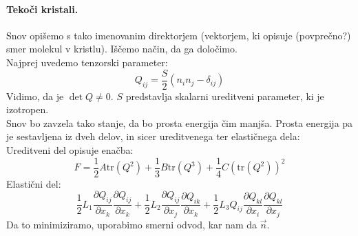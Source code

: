\documentclass[a4paper]{article}
\newcommand{\vct}[1]{\overrightarrow{#1}}
\newcommand{\pd}[2]{\frac{\partial {#1}}{\partial {#2}}}
\begin{document}
\paragraph{Tekoči kristali.} Snov opišemo s tako imenovanim direktorjem (vektorjem, ki opisuje (povprečno?) smer molekul v kristlu). Iščemo način, da ga določimo. \\
Najprej uvedemo tenzorski parameter:
$$Q_{ij} = \frac{S}{2} \left(n_in_j - \delta_{ij}\right)$$
Vidimo, da je $\det Q \neq 0$. $S$ predstavlja skalarni ureditveni parameter, ki je izotropen. \\[3mm]
Snov bo zavzela tako stanje, da bo prosta energija čim manjša. Prosta energija pa je sestavljena iz dveh delov, in sicer ureditvenega ter elastičnega dela: \\[3mm]
Ureditveni del opisuje enačba: $$F = \frac{1}{2}A\mathrm{tr}(Q^2) + \frac{1}{3}B\mathrm{tr}(Q^3) + \frac{1}{4}C\left(\mathrm{tr}(Q^2)\right)^2$$
Elastični del:
$$\frac{1}{2}L_1\pd{{Q}_{ij}}{x_k}\pd{Q_{ij}}{x_k} + \frac{1}{2}L_2\pd{Q_{ij}}{x_j}\pd{Q_{ik}}{x_k} + \frac{1}{2}L_3Q_{ij}\pd{Q_{kl}}{x_i}\pd{Q_{kl}}{x_j}$$
Da to minimiziramo, uporabimo smerni odvod, kar nam da $\vct{n}$.
\end{document}
